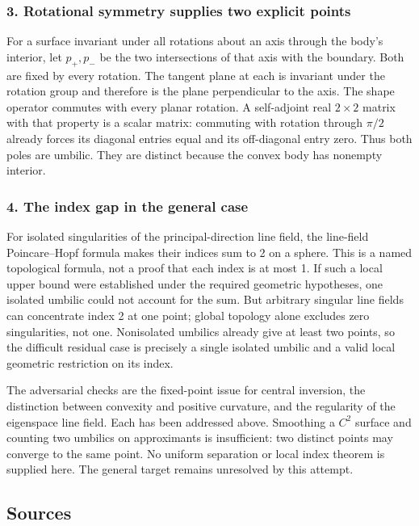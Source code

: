 \documentclass[11pt,a4paper]{article}
\begin{document}
\subsubsection{3. Rotational symmetry supplies two explicit points}
For a surface invariant under all rotations about an axis through the body's interior, let $p_+,p_-$ be the two intersections of that axis with the boundary. Both are fixed by every rotation. The tangent plane at each is invariant under the rotation group and therefore is the plane perpendicular to the axis. The shape operator commutes with every planar rotation. A self-adjoint real $2\times2$ matrix with that property is a scalar matrix: commuting with rotation through $\pi/2$ already forces its diagonal entries equal and its off-diagonal entry zero. Thus both poles are umbilic. They are distinct because the convex body has nonempty interior.

\subsubsection{4. The index gap in the general case}
For isolated singularities of the principal-direction line field, the line-field Poincare--Hopf formula makes their indices sum to 2 on a sphere. This is a named topological formula, not a proof that each index is at most 1. If such a local upper bound were established under the required geometric hypotheses, one isolated umbilic could not account for the sum. But arbitrary singular line fields can concentrate index 2 at one point; global topology alone excludes zero singularities, not one. Nonisolated umbilics already give at least two points, so the difficult residual case is precisely a single isolated umbilic and a valid local geometric restriction on its index.

The adversarial checks are the fixed-point issue for central inversion, the distinction between convexity and positive curvature, and the regularity of the eigenspace line field. Each has been addressed above. Smoothing a $C^2$ surface and counting two umbilics on approximants is insufficient: two distinct points may converge to the same point. No uniform separation or local index theorem is supplied here. The general target remains unresolved by this attempt.

\subsection{Sources}
\end{document}
